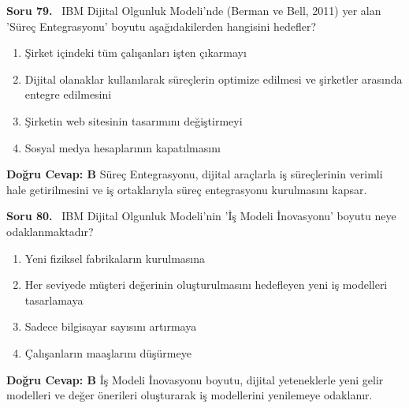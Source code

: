 \documentclass[11pt,a4paper,openany]{book}
\begin{document}
\needspace{5cm}
\vspace{8pt}
\noindent\textbf{\large\sffamily Soru 79.} \ IBM Dijital Olgunluk Modeli'nde (Berman ve Bell, 2011) yer alan 'Süreç Entegrasyonu' boyutu aşağıdakilerden hangisini hedefler?
\begin{enumerate}[label=\Alph*), leftmargin=25pt, topsep=4pt, itemsep=2pt]
    \item Şirket içindeki tüm çalışanları işten çıkarmayı
    \item Dijital olanaklar kullanılarak süreçlerin optimize edilmesi ve şirketler arasında entegre edilmesini
    \item Şirketin web sitesinin tasarımını değiştirmeyi
    \item Sosyal medya hesaplarının kapatılmasını
\end{enumerate}
\vspace{4pt}
\begin{tcolorbox}[title=Cevap ve Açıklama, colback=gray!3!white, colframe=primarycolor!90!black, arc=2mm, fonttitle=\bfseries\sffamily, top=6pt, bottom=6pt]
    \textbf{Doğru Cevap: B}
    \vspace{2pt}
    Süreç Entegrasyonu, dijital araçlarla iş süreçlerinin verimli hale getirilmesini ve iş ortaklarıyla süreç entegrasyonu kurulmasını kapsar.
\end{tcolorbox}
\vspace{10pt}

\needspace{5cm}
\vspace{8pt}
\noindent\textbf{\large\sffamily Soru 80.} \ IBM Dijital Olgunluk Modeli'nin 'İş Modeli İnovasyonu' boyutu neye odaklanmaktadır?
\begin{enumerate}[label=\Alph*), leftmargin=25pt, topsep=4pt, itemsep=2pt]
    \item Yeni fiziksel fabrikaların kurulmasına
    \item Her seviyede müşteri değerinin oluşturulmasını hedefleyen yeni iş modelleri tasarlamaya
    \item Sadece bilgisayar sayısını artırmaya
    \item Çalışanların maaşlarını düşürmeye
\end{enumerate}
\vspace{4pt}
\begin{tcolorbox}[title=Cevap ve Açıklama, colback=gray!3!white, colframe=primarycolor!90!black, arc=2mm, fonttitle=\bfseries\sffamily, top=6pt, bottom=6pt]
    \textbf{Doğru Cevap: B}
    \vspace{2pt}
    İş Modeli İnovasyonu boyutu, dijital yeteneklerle yeni gelir modelleri ve değer önerileri oluşturarak iş modellerini yenilemeye odaklanır.
\end{tcolorbox}
\vspace{10pt}
\end{document}
